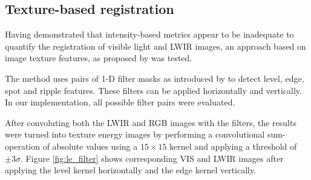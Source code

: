 \documentclass{l4proj}
\begin{document}
\subsection{Texture-based registration}

Having demonstrated that intensity-based metrics appear to be inadequate to quantify the registration of visible light and LWIR images, an approach based on image texture features, as proposed by \citet{jarc_graz_2007} was tested. 

The method uses pairs of 1-D filter masks as introduced by \citet{laws_rapid_1980} to detect level, edge, spot and ripple features. These filters can be applied horizontally and vertically. In our implementation, all possible filter pairs were evaluated.

After convoluting both the LWIR and RGB images with the filters, the results were turned into texture energy images by performing a convolutional sum-operation of absolute values using a $15 \times 15$ kernel and applying a threshold of $\pm 3 \sigma$. Figure \ref{fig:le_filter} shows corresponding VIS and LWIR images after applying the level kernel horizontally and the edge kernel vertically.
\end{document}
